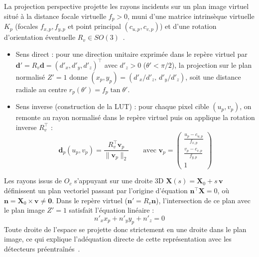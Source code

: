 \documentclass[11pt,a4paper]{article}
\renewcommand{\emph}[1]{\textup{#1}}
\begin{document}
La projection perspective projette les rayons incidents sur un plan image virtuel situé à la distance focale virtuelle $f_p > 0$, muni d'une matrice intrinsèque virtuelle $K_p$ (focales $f_{x,p}, f_{y,p}$ et point principal $(c_{u,p}, c_{v,p})$) et d'une rotation d'orientation éventuelle $R_v \in SO(3)$~\cite{hughes2008,bradski2008}.
\begin{itemize}
  \item \emph{Sens direct :} pour une direction unitaire exprimée dans le repère virtuel par $\mathbf{d}' = R_v \mathbf{d} = (d'_x, d'_y, d'_z)^\top$ avec $d'_z > 0$ ($\theta' < \pi/2$), la projection sur le plan normalisé $Z' = 1$ donne $(x_p, y_p) = (d'_x / d'_z, \, d'_y / d'_z)$, soit une distance radiale au centre $r_p(\theta') = f_p \tan\theta'$.
  \item \emph{Sens inverse (construction de la LUT) :} pour chaque pixel cible $(u_p, v_p)$, on remonte au rayon normalisé dans le repère virtuel puis on applique la rotation inverse $R_v^\top$ :
  \begin{equation}
    \mathbf{d}_p(u_p, v_p) = \frac{R_v^\top \mathbf{v}_p}{\|\mathbf{v}_p\|_2} \qquad \text{avec } \mathbf{v}_p = \begin{pmatrix} \frac{u_p - c_{u,p}}{f_{x,p}} \\ \frac{v_p - c_{v,p}}{f_{y,p}} \\ 1 \end{pmatrix}
  \end{equation}
\end{itemize}


Les rayons issus de $O_c$ s'appuyant sur une droite 3D $\mathbf{X}(s) = \mathbf{X}_0 + s\,\mathbf{v}$ définissent un plan vectoriel passant par l'origine d'équation $\mathbf{n}^\top \mathbf{X} = 0$, où $\mathbf{n} = \mathbf{X}_0 \times \mathbf{v} \neq \mathbf{0}$. Dans le repère virtuel ($\mathbf{n}' = R_v \mathbf{n}$), l'intersection de ce plan avec le plan image $Z' = 1$ satisfait l'équation linéaire :
\begin{equation}
  n'_x x_p + n'_y y_p + n'_z = 0
\end{equation}
Toute droite de l'espace se projette donc strictement en une droite dans le plan image, ce qui explique l'adéquation directe de cette représentation avec les détecteurs préentraînés~\cite{hughes2008}.
\end{document}

